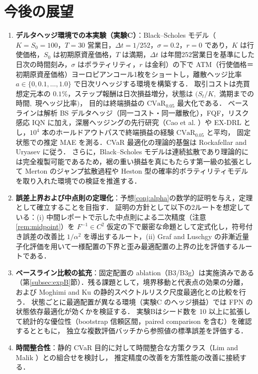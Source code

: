 \documentclass[a4paper,10pt]{jsarticle}
\theoremstyle{definition}
\newcommand{\CVaR}{\mathrm{CVaR}}
\newcommand{\Finv}{F^{-1}}
\begin{document}
\section{今後の展望}
\label{sec:future}
\begin{enumerate}
  \item \textbf{デルタヘッジ環境での本実験（実験C）}：Black--Scholes モデル（$K=S_0=100$，$T=30$ 営業日，$\Delta t=1/252$，$\sigma=0.2$，$r=0$ であり，$K$ は行使価格，$S_0$ は初期原資産価格，$T$ は満期，$\Delta t$ は年間252営業日を基準にした日次の時間刻み，$\sigma$ はボラティリティ，$r$ は金利）の下で
  ATM（行使価格＝初期原資産価格）ヨーロピアンコール1枚をショートし，離散ヘッジ比率 $a\in\{0,0.1,\dots,1.0\}$ で日次リヘッジする環境を構築する．
  取引コストは売買想定元本の $0.1\%$，ステップ報酬は日次損益増分，状態は $(S_t/K,$ 満期までの時間$,$ 現ヘッジ比率$)$，
  目的は終端損益の $\CVaR_{0.05}$ 最大化である．
  ベースラインは解析 BS デルタヘッジ（同一コスト・同一離散化），FQF，リスク感応 IQN に加え，深層ヘッジングの先行研究（Cao et al. \cite{cao2021deep,cao2023gamma}）や EX-DRL \cite{malekzadeh2024exdrl} とし，$10^4$ 本のホールドアウトパスで終端損益の経験 $\CVaR_{0.05}$ と平均，
  固定状態での推定 MAE を測る．CVaR 最適化の理論的基盤は Rockafellar and Uryasev \cite{rockafellar2000cvar} に従う．
  さらに，Black--Scholes モデルは連続拡散であり理論的には完全複製可能であるため，裾の重い損益を真にもたらす第一級の拡張として Merton のジャンプ拡散過程や Heston 型の確率的ボラティリティモデルを取り入れた環境での検証を推進する．
  \item \textbf{誤差上界および中点則の定理化}：予想\ref{conj:alpha}の数学的証明を与え，定理として確立することを目指す．
  証明の方針として以下の2ルートを想定している：(i) 中間レポートで示した中点則による二次精度（注意\ref{rem:midpoint}）を $\Finv\in C^2$ 仮定の下で厳密な命題として定式化し，符号付き誤差の改善比 $1/\alpha^2$ を導出するルート，(ii) Graf and Luschgy \cite{graf2000quantization} の非漸近量子化評価を用いて一様配置の下界と歪み最適配置の上界の比を評価するルートである．
  \item \textbf{ベースライン比較の拡充}：固定配置の ablation（B3/B3g）は実施済みである（第\ref{subsec:expB}節）．残る課題として，境界移動と代表点の効果の分離，
  および Moghimi and Ku \cite{moghimi2025beyond} の静的スペクトルリスク尺度最適化との比較を行う．
  状態ごとに最適配置が異なる環境（実験C のヘッジ損益）では FPN の状態依存最適化が効くかを検証する．
  実験Bはシード数を 10 以上に拡張して統計的な優位性（bootstrap 信頼区間，paired comparison を含む）を確認するとともに，
  独立な複数評価バッチから参照値の標準誤差を評価する．
  \item \textbf{時間整合性}：静的 CVaR 目的に対して時間整合な方策クラス（Lim and Malik \cite{lim2022distributional}）との組合せを検討し，
  推定精度の改善を方策性能の改善に接続する．
\end{enumerate}
\end{document}
